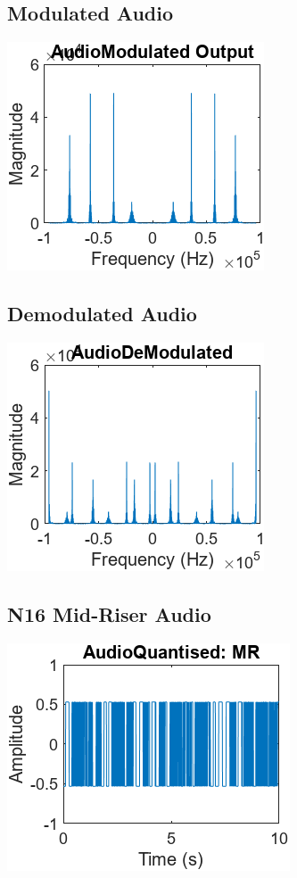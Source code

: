 \documentclass{article}
\begin{document}
\subsection{Modulated Audio}
\label{sec: ModAudio}
\includegraphics{modulated.png}
\subsection{Demodulated Audio}
\label{sec: DemodAudio}
\includegraphics{demodulated.png}
\subsection{N16 Mid-Riser Audio}
\label{sec: N16MR}
\includegraphics{N16MR.png}
\end{document}
